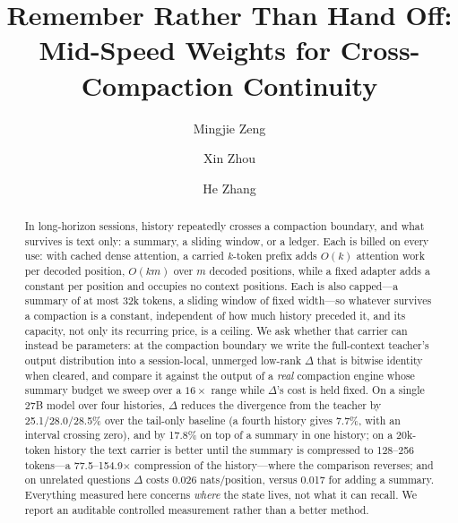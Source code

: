 \documentclass[sigconf,nonacm]{acmart}
\begin{document}
\title{Remember Rather Than Hand Off:\\
Mid-Speed Weights for Cross-Compaction Continuity}

\author{Mingjie Zeng}

\author{Xin Zhou}

\author{He Zhang}

\begin{abstract}
In long-horizon sessions, history repeatedly crosses a compaction boundary, and what survives is text only: a
summary, a sliding window, or a ledger. Each is billed on every use: with cached dense attention, a carried
$k$-token prefix adds $O(k)$ attention work per decoded position, $O(km)$ over $m$ decoded positions, while a fixed
adapter adds a constant per position and occupies no context positions. Each is also capped---a summary of at most 32k tokens, a sliding window of fixed width---so whatever
survives a compaction is a constant, independent of how much history preceded it, and its capacity, not only
its recurring price, is a ceiling. We
ask whether that carrier can instead be parameters: at the compaction boundary we write the full-context
teacher's output distribution into a session-local, unmerged low-rank $\Delta$ that is bitwise identity when
cleared, and compare it against the output of a \emph{real} compaction engine whose summary budget we sweep
over a $16\times$ range while $\Delta$'s cost is held fixed. On a single
27B model over four histories, $\Delta$ reduces the divergence from the teacher by 25.1/28.0/28.5\% over
the tail-only baseline (a fourth history gives 7.7\%, with an interval crossing zero), and by 17.8\% on top
of a summary in one history; on a 20k-token history the text carrier is better until the summary is compressed
to 128--256 tokens---a 77.5--154.9$\times$ compression of the history---where the comparison reverses; and on
unrelated questions $\Delta$ costs 0.026
nats/position, versus 0.017 for adding a summary. Everything measured here concerns \emph{where} the state
lives, not what it can recall. We report an auditable controlled measurement rather than a
better method.
\end{abstract}
\end{document}

